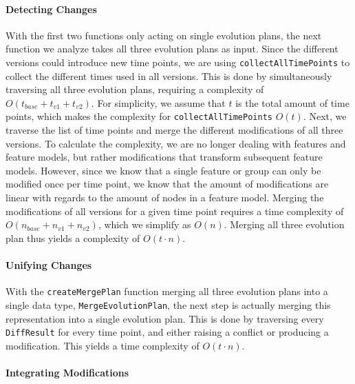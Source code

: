 \documentclass[a4paper,english]{ifimaster}
\begin{document}
\paragraph{Detecting Changes}

With the first two functions only acting on single evolution plans, the next function we analyze takes all three evolution plans as input. Since the different versions could introduce new time points, we are using \texttt{collectAllTimePoints} to collect the different times used in all versions. This is done by simultaneously traversing all three evolution plans, requiring a complexity of $O(t_{base} + t_{v1} + t_{v2})$. For simplicity, we assume that $t$ is the total amount of time points, which makes the complexity for \texttt{collectAllTimePoints} $O(t)$. Next, we traverse the list of time points and merge the different modifications of all three versions. To calculate the complexity, we are no longer dealing with features and feature models, but rather modifications that transform subsequent feature models. However, since we know that a single feature or group can only be modified once per time point, we know that the amount of modifications are linear with regards to the amount of nodes in a feature model. Merging the modifications of all versions for a given time point requires a time complexity of $O(n_{base} + n_{v1} + n_{v2})$, which we simplify as $O(n)$. Merging all three evolution plan thus yields a complexity of $O(t \cdot n)$.

\paragraph{Unifying Changes}

With the \texttt{createMergePlan} function merging all three evolution plans into a single data type, \texttt{MergeEvolutionPlan}, the next step is actually merging this representation into a single evolution plan. This is done by traversing every \texttt{DiffResult} for every time point, and either raising a conflict or producing a modification. This yields a time complexity of $O(t \cdot n)$.

\paragraph{Integrating Modifications}
\end{document}
